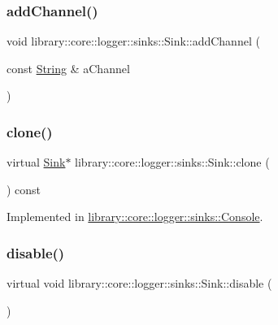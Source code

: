 \subsubsection{\texorpdfstring{add\+Channel()}{addChannel()}}
{\footnotesize\ttfamily void library\+::core\+::logger\+::sinks\+::\+Sink\+::add\+Channel (\begin{DoxyParamCaption}\item[{const \hyperlink{classlibrary_1_1core_1_1types_1_1String}{String} \&}]{a\+Channel }\end{DoxyParamCaption})}

\mbox{\label{classlibrary_1_1core_1_1logger_1_1sinks_1_1Sink_a00ba941947d903825f4922694e0961dd}} 
\subsubsection{\texorpdfstring{clone()}{clone()}}
{\footnotesize\ttfamily virtual \hyperlink{classlibrary_1_1core_1_1logger_1_1sinks_1_1Sink}{Sink}$\ast$ library\+::core\+::logger\+::sinks\+::\+Sink\+::clone (\begin{DoxyParamCaption}{ }\end{DoxyParamCaption}) const\hspace{0.3cm}{\ttfamily [pure virtual]}}



Implemented in \hyperlink{classlibrary_1_1core_1_1logger_1_1sinks_1_1Console_ac5c80193b0832f760a7447e7abc7d468}{library\+::core\+::logger\+::sinks\+::\+Console}.

\mbox{\label{classlibrary_1_1core_1_1logger_1_1sinks_1_1Sink_a3ab28f7a964d138fc9d080f026bb4143}} 
\subsubsection{\texorpdfstring{disable()}{disable()}}
{\footnotesize\ttfamily virtual void library\+::core\+::logger\+::sinks\+::\+Sink\+::disable (\begin{DoxyParamCaption}{ }\end{DoxyParamCaption})\hspace{0.3cm}{\ttfamily [pure virtual]}}



